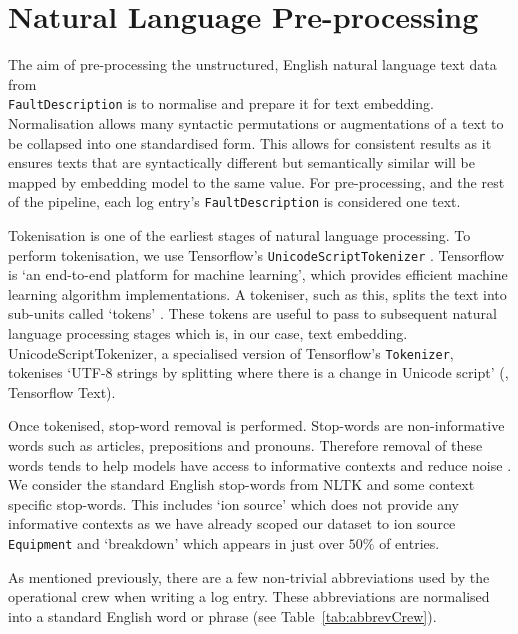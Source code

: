 \documentclass[10pt,oneside]{report}
\begin{document}

\section{Natural Language Pre-processing}\label{sec:preproc}

The aim of pre-processing the unstructured, English natural language text data from \\ \texttt{FaultDescription} is to normalise and prepare it for text embedding. Normalisation allows many syntactic permutations or augmentations of a text to be collapsed into one standardised form. This allows for consistent results as it ensures texts that are syntactically different but semantically similar will be mapped by embedding model to the same value. For pre-processing, and the rest of the pipeline, each log entry's \texttt{FaultDescription} is considered one text.


Tokenisation is one of the earliest stages of natural language processing. To perform tokenisation, we use Tensorflow's \texttt{UnicodeScriptTokenizer} \cite{tensorflow2015whitepaper}. Tensorflow is `an end-to-end platform for machine learning', which provides efficient machine learning algorithm implementations. A tokeniser, such as this, splits the text into sub-units called `tokens' \cite{gefenstette1999tokenization}. These tokens are useful to pass to subsequent natural language processing stages which is, in our case, text embedding. UnicodeScriptTokenizer, a specialised version of Tensorflow's \texttt{Tokenizer}, tokenises `UTF-8 strings by splitting where there is a change in Unicode script' (\cite{tensorflow2015whitepaper}, Tensorflow Text). 

Once tokenised, stop-word removal is performed. Stop-words are non-informative words such as articles, prepositions and pronouns. Therefore removal of these words tends to help models have access to informative contexts and reduce noise \cite{silva2003importance}. We consider the standard English stop-words from NLTK \cite{bird2009natural} and some context specific stop-words. This includes `ion source' which does not provide any informative contexts as we have already scoped our dataset to ion source \texttt{Equipment} and `breakdown' which appears in just over $50\%$ of entries. 

As mentioned previously, there are a few non-trivial abbreviations used by the operational crew when writing a log entry. These abbreviations are normalised into a standard English word or phrase (see Table~\ref{tab:abbrevCrew}).
\end{document}
